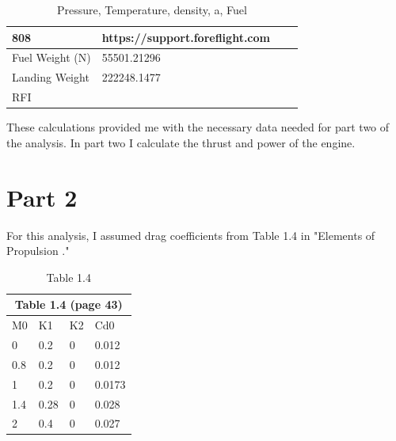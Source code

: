 \documentclass[12pt]{report}
\begin{document}
\begin{table}[H]
{\begin{tabular}[htp]{|llll|}
  \multicolumn{1}{l|}{808} &
  \multicolumn{1}{l|}{https://support.foreflight.com} &
   \\ \hline
\multicolumn{1}{|l|}{Fuel Weight (N)} & \multicolumn{1}{l|}{55501.21296}                    & \multicolumn{1}{l|}{}               &  \\ \hline
\multicolumn{1}{|l|}{Landing Weight}  & \multicolumn{1}{l|}{222248.1477}                    & \multicolumn{1}{l|}{}               &  \\ \hline
\multicolumn{1}{|l|}{RFI}             & \multicolumn{1}{l|}{}                               & \multicolumn{1}{l|}{}               &  \\ \hline
\end{tabular}%
}
\caption{Pressure, Temperature, density, a, Fuel}
\label{tab:my-table}
\end{table}

These calculations provided me with the necessary data needed for part two of the analysis. In part two I calculate the thrust and power of the engine.\\

\chapter{Part 2}
For this analysis, I assumed drag coefficients from Table 1.4 in "Elements of Propulsion \cite{mattingly2006elements}."

\begin{table}[H]
\centering
\begin{tabular}{|llll|}
\hline
\multicolumn{4}{|c|}{\cellcolor[HTML]{9B9B9B}\textbf{Table 1.4 (page 43)}}               \\ \hline
\multicolumn{1}{|l|}{M0}  & \multicolumn{1}{l|}{K1}   & \multicolumn{1}{l|}{K2} & Cd0    \\ \hline
\multicolumn{1}{|l|}{0}   & \multicolumn{1}{l|}{0.2}  & \multicolumn{1}{l|}{0}  & 0.012  \\ \hline
\multicolumn{1}{|l|}{0.8} & \multicolumn{1}{l|}{0.2}  & \multicolumn{1}{l|}{0}  & 0.012  \\ \hline
\multicolumn{1}{|l|}{1}   & \multicolumn{1}{l|}{0.2}  & \multicolumn{1}{l|}{0}  & 0.0173 \\ \hline
\multicolumn{1}{|l|}{1.4} & \multicolumn{1}{l|}{0.28} & \multicolumn{1}{l|}{0}  & 0.028  \\ \hline
\multicolumn{1}{|l|}{2}   & \multicolumn{1}{l|}{0.4}  & \multicolumn{1}{l|}{0}  & 0.027  \\ \hline
\end{tabular}
\caption{Table 1.4}
\label{tab:Table 1.4 (page 43)}
\end{table}
\end{document}
